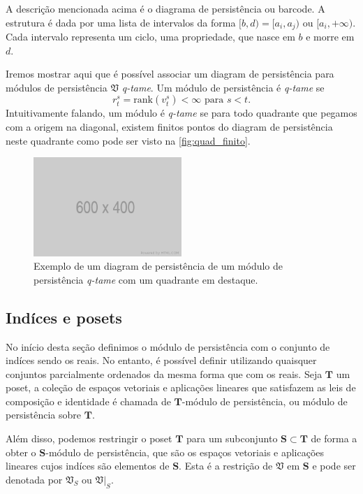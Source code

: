 A descrição mencionada acima é o diagrama de persistência ou barcode. A estrutura é dada por uma 
lista de intervalos da forma $[b,d) = [a_i, a_j)$ ou $[a_i, +\infty)$. Cada intervalo representa
um ciclo, uma propriedade, que nasce em $b$ e morre em $d$. 

Iremos mostrar aqui que é possível associar um diagram de persistência para módulos de 
persistência $\mathfrak{V}$ \textit{q-tame}. Um módulo de persistência é \textit{q-tame} 
se 
\begin{equation*}
    r_t^s = \text{rank}(v_t^s) < \infty \text{ para } s < t.
\end{equation*}
Intuitivamente falando, um módulo é \textit{q-tame} se para todo quadrante que pegamos com a origem
na diagonal, existem finitos pontos do diagram de persistência neste quadrante como pode ser visto
na \autoref{fig:quad_finito}.

\begin{figure}
    \centering
    \includegraphics[width=0.5\textwidth]{images/placeholder.png}
    \caption{Exemplo de um diagram de persistência de um módulo de 
            persistência \textit{q-tame} com um quadrante em destaque.}
    \label{fig:quad_finito}
\end{figure}

\subsection{Indíces e posets} 
No início desta seção definimos o módulo de persistência com o conjunto de indíces sendo os reais. No 
entanto, é possível definir utilizando quaisquer conjuntos parcialmente ordenados da mesma forma que 
com os reais. Seja $\mathbf{T}$ um poset, a coleção de espaços vetoriais e aplicações lineares que 
satisfazem as leis de composição e identidade é chamada de $\mathbf{T}$-módulo de persistência, ou 
módulo de persistência sobre $\mathbf{T}$. 

Além disso, podemos restringir o poset $\mathbf{T}$ para um subconjunto $\mathbf{S} \subset \mathbf{T}$
de forma a obter o $\mathbf{S}$-módulo de persistência, que são os espaços vetoriais e aplicações lineares
cujos indíces são elementos de $\mathbf{S}$. Esta é a restrição de $\mathfrak{V}$ em $\mathbf{S}$ e pode
ser denotada por $\mathfrak{V}_S$ ou $\left.\mathfrak{V}\right|_S$. 

